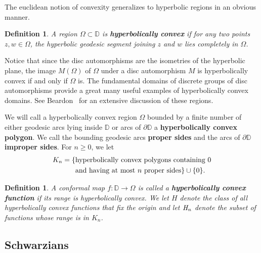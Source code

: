 \documentclass{lms}
\newcommand{\D}{\mathbb D}
\newtheorem{definition}[theorem]{Definition}
\numberwithin{equation}{section}
\begin{document}
The euclidean notion of convexity generalizes to hyperbolic regions in an
obvious manner.

\begin{definition}A region $\Omega\subset\D$ is \textbf{hyperbolically convex}
if for any two points $z,w\in\Omega$, the hyperbolic  geodesic segment joining 
$z$ and $w$ lies completely in $\Omega$.
\end{definition}


Notice that since the disc automorphisms are the isometries
of the hyperbolic plane, the image $M(\Omega)$ of $\Omega$ under a disc
automorphism $M$ is hyperbolically convex if and only if $\Omega$ is.
The fundamental domains of discrete groups of disc automorphisms
provide a great many useful examples of hyperbolically convex domains.
See Beardon~\cite{aB83} for an extensive discussion of these regions.


We will call a
hyperbolically convex region $\Omega$ bounded by a finite number of
either geodesic arcs lying inside $\D$ or arcs of $\partial \D$ a
\textbf{hyperbolically convex polygon}.
We call the bounding geodesic arcs \textbf{proper sides} and the arcs
of $\partial \D$ \textbf{improper sides}.
For $n\geq 0$, we let 
\begin{align}\notag
K_n=\{&\text{hyperbolically convex polygons  containing $0$}\\\notag
& \text{and  having  
at most $n$ proper sides}\}
\cup\{0\}.
\end{align}



\begin{definition}A conformal map $f:\D\to\Omega$ is called a
\textbf{hyperbolically convex function} if its range is hyperbolically convex.
We let $\mathbf {\mathit H}$ 
denote the class of all hyperbolically convex functions that fix the origin 
 and let $\bf{\mathit H_{\mathit n}}$ denote the subset of functions whose range
is in $K_n$.
\end{definition}





\subsection{Schwarzians}
\end{document}
